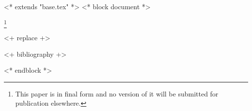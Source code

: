 <* extends "base.tex" *>
<* block document *>
\subjclass[2020]{\docclasses}
\keywords{\dockeywords}



\title[\shorttitlename]{\titlename}
\author{<+ user.name +>}
\address{<+ user.institution +>, <+ user.address +>}
\thanks{This paper is in final form and no version of it will be submitted for publication elsewhere.}

\begin{abstract}
    <+ replace +>
\end{abstract}

\maketitle
\tableofcontents

<+ replace +>

<+ bibliography +>


<* endblock *>
